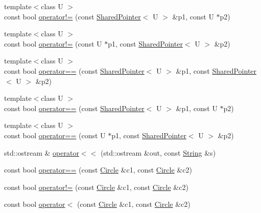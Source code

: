 \begin{DoxyCompactItemize}
\item 
{\footnotesize template$<$class U $>$ }\\const bool \hyperlink{namespaceprism_ad6391c124e006b0e3a3ec67f55e208b0}{operator!=} (const \hyperlink{classprism_1_1_shared_pointer}{Shared\+Pointer}$<$ U $>$ \&p1, const U $\ast$p2)
\item 
{\footnotesize template$<$class U $>$ }\\const bool \hyperlink{namespaceprism_ab8792dbd5cac5678390843bacdb69daa}{operator!=} (const U $\ast$p1, const \hyperlink{classprism_1_1_shared_pointer}{Shared\+Pointer}$<$ U $>$ \&p2)
\item 
{\footnotesize template$<$class U $>$ }\\const bool \hyperlink{namespaceprism_ae53d52e8a36ec7ca58ea1731cc18f1d8}{operator==} (const \hyperlink{classprism_1_1_shared_pointer}{Shared\+Pointer}$<$ U $>$ \&p1, const \hyperlink{classprism_1_1_shared_pointer}{Shared\+Pointer}$<$ U $>$ \&p2)
\item 
{\footnotesize template$<$class U $>$ }\\const bool \hyperlink{namespaceprism_a2b73e87f080646696ed6b595a3900119}{operator==} (const \hyperlink{classprism_1_1_shared_pointer}{Shared\+Pointer}$<$ U $>$ \&p1, const U $\ast$p2)
\item 
{\footnotesize template$<$class U $>$ }\\const bool \hyperlink{namespaceprism_a1f29b22985dc0ec1fc548a551ce313ed}{operator==} (const U $\ast$p1, const \hyperlink{classprism_1_1_shared_pointer}{Shared\+Pointer}$<$ U $>$ \&p2)
\item 
std\+::ostream \& \hyperlink{namespaceprism_a0a166bbf645cc854542cc0fc50324670}{operator$<$$<$} (std\+::ostream \&out, const \hyperlink{classprism_1_1_string}{String} \&s)
\item 
const bool \hyperlink{namespaceprism_a0ce1ad6e6392618212d5ab3bebb8e585}{operator==} (const \hyperlink{classprism_1_1_circle}{Circle} \&c1, const \hyperlink{classprism_1_1_circle}{Circle} \&c2)
\item 
const bool \hyperlink{namespaceprism_a58cbf7ef406800002b446a0f1e917745}{operator!=} (const \hyperlink{classprism_1_1_circle}{Circle} \&c1, const \hyperlink{classprism_1_1_circle}{Circle} \&c2)
\item 
const bool \hyperlink{namespaceprism_a8e662d15b162ca76912c491798caefd3}{operator$<$} (const \hyperlink{classprism_1_1_circle}{Circle} \&c1, const \hyperlink{classprism_1_1_circle}{Circle} \&c2)
\item 

\end{DoxyCompactItemize}
